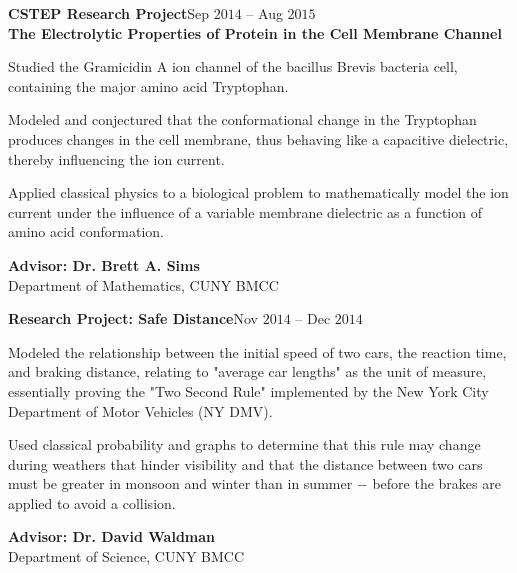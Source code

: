 \documentclass[a4paper, 12pt]{article}
\begin{document}
\begin{flushleft}
\begin{flushleft}
\textbf{CSTEP Research Project}\hfill Sep $2014$ -- Aug $2015$\\
\textbf{The Electrolytic Properties of Protein in the Cell Membrane Channel}
\begin{compactitem}
    \item Studied the Gramicidin A ion channel of the bacillus Brevis bacteria cell, containing the major amino acid Tryptophan.
    \item Modeled and conjectured that the conformational change in the Tryptophan produces changes in the cell membrane, thus behaving like a capacitive dielectric, thereby influencing the ion current.
    \item Applied classical physics to a biological problem to mathematically model the ion current under the influence of a variable membrane dielectric as a function of amino acid conformation.
\end{compactitem}
\textbf{Advisor: Dr. Brett A. Sims}\\
Department of Mathematics, CUNY BMCC
\end{flushleft}

\begin{flushleft}
\textbf{Research Project: Safe Distance}\hfill Nov $2014$ -- Dec $2014$\\
\begin{compactitem}
    \item Modeled the relationship between the initial speed of two cars, the reaction time, and braking distance, relating to "average car lengths" as the unit of measure, essentially proving the "Two Second Rule" implemented by the New York City Department of Motor Vehicles (NY DMV).
    \item Used classical probability and graphs to determine that this rule may change during weathers that hinder visibility and that the distance between two cars must be greater in monsoon and winter than in summer $-$ before the brakes are applied to avoid a collision.
\end{compactitem}
\textbf{Advisor: Dr. David Waldman}\\
Department of Science, CUNY BMCC
\end{flushleft}
\end{flushleft}
\end{document}
